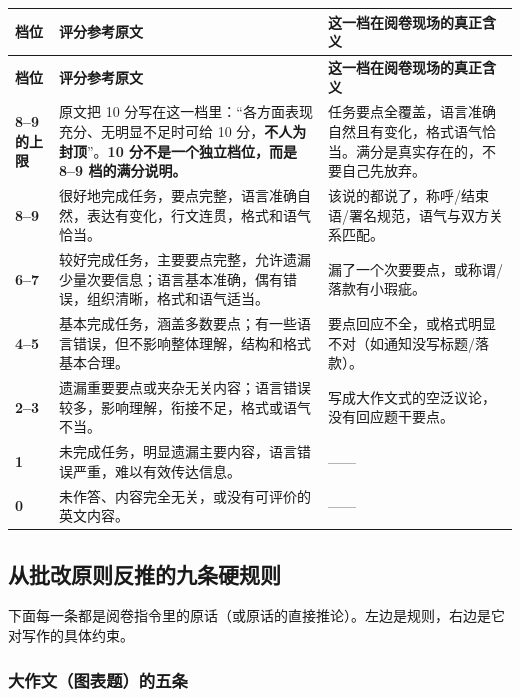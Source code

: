 \documentclass[11pt,a4paper]{ctexart}
\begin{document}
\begin{longtable}{C{1.5cm} L{6.2cm} L{7.4cm}}
\toprule
\textbf{档位} & \textbf{评分参考原文} & \textbf{这一档在阅卷现场的真正含义}\\
\midrule
\endfirsthead
\toprule
\textbf{档位} & \textbf{评分参考原文} & \textbf{这一档在阅卷现场的真正含义}\\
\midrule
\endhead
\textbf{8--9 的上限} & 原文把 10 分写在这一档里：“各方面表现充分、无明显不足时可给 10 分，\textbf{不人为封顶}”。\textbf{10 分不是一个独立档位，而是 8--9 档的满分说明。} & 任务要点全覆盖，语言准确自然且有变化，格式语气恰当。满分是真实存在的，不要自己先放弃。\\
\midrule
\textbf{8--9} & 很好地完成任务，要点完整，语言准确自然，表达有变化，行文连贯，格式和语气恰当。 & 该说的都说了，称呼/结束语/署名规范，语气与双方关系匹配。\\
\midrule
\textbf{6--7} & 较好完成任务，主要要点完整，允许遗漏少量次要信息；语言基本准确，偶有错误，组织清晰，格式和语气适当。 & 漏了一个次要要点，或称谓/落款有小瑕疵。\\
\midrule
\textbf{4--5} & 基本完成任务，涵盖多数要点；有一些语言错误，但不影响整体理解，结构和格式基本合理。 & 要点回应不全，或格式明显不对（如通知没写标题/落款）。\\
\midrule
\textbf{2--3} & 遗漏重要要点或夹杂无关内容；语言错误较多，影响理解，衔接不足，格式或语气不当。 & 写成大作文式的空泛议论，没有回应题干要点。\\
\midrule
\textbf{1} & 未完成任务，明显遗漏主要内容，语言错误严重，难以有效传达信息。 & ——\\
\midrule
\textbf{0} & 未作答、内容完全无关，或没有可评价的英文内容。 & ——\\
\bottomrule
\end{longtable}

\subsection{从批改原则反推的九条硬规则}

下面每一条都是阅卷指令里的原话（或原话的直接推论）。左边是规则，右边是它对写作的具体约束。

\subsubsection{大作文（图表题）的五条}
\end{document}
